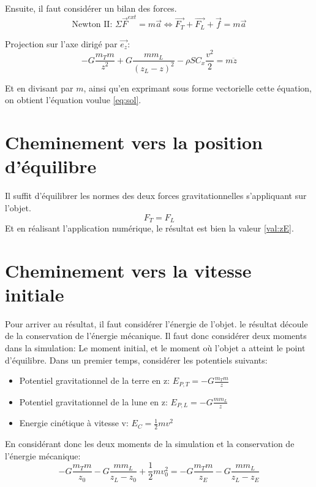 \documentclass[a4paper,12pt,twoside]{article}
\begin{document}
Ensuite, il faut considérer un bilan des forces.
\begin{equation}
	\text{Newton II: }\Sigma\vec{F}^{ext} = m\vec{a} \Leftrightarrow \vec{F_T} + \vec{F_L} + \vec{f} = m\vec{a}
\end{equation}

Projection sur l'axe dirigé par $\vec{e_z}$:
\begin{equation}
	-G\frac{m_T m}{z^2} + G\frac{m m_L }{(z_L-z)^2} - \rho S C_x \frac{v^2}{2} = m\ddot{z}
\end{equation}

Et en divisant par $m$, ainsi qu'en exprimant sous forme vectorielle cette équation, on obtient l'équation voulue \ref{eq:sol}.

\section{Cheminement vers la position d'équilibre}
\label{ann:pos-eq}
Il suffit d'équilibrer les normes des deux forces gravitationnelles s'appliquant sur l'objet.
\begin{equation}
	F_T = F_L
\end{equation}
Et en réalisant l'application numérique, le résultat est bien la valeur \ref{val:zE}.


\section{Cheminement vers la vitesse initiale}
\label{ann:vit-init}
Pour arriver au résultat, il faut considérer l'énergie de l'objet.
le résultat découle de la conservation de l'énergie mécanique.
Il faut donc considérer deux moments dans la simulation: Le moment initial, et le moment où l'objet a atteint le point d'équilibre.
Dans un premier temps, considérer les potentiels suivants:
\begin{itemize}
	\item Potentiel gravitationnel de la terre en z: $E_{P,T} = -G\frac{m_T m}{z}$
	\item Potentiel gravitationnel de la lune en z: $E_{P,L} = -G\frac{m m_L}{z}$
	\item Energie cinétique à vitesse v: $E_C = \frac{1}{2}mv^2$
\end{itemize}

En considérant donc les deux moments de la simulation et la conservation de l'énergie mécanique:
\begin{equation}
	-G\frac{m_T m}{z_0} - G\frac{m m_L}{z_L - z_0} + \frac{1}{2}mv_0^2 = -G\frac{m_T m}{z_E} - G\frac{m m_L}{z_L - z_E}
\end{equation}
\end{document}
